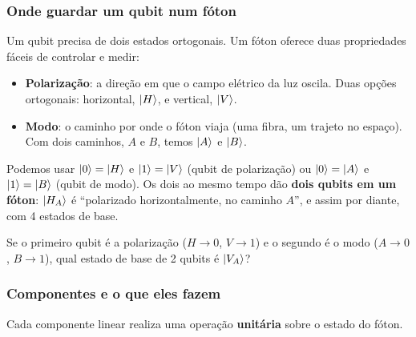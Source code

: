 \subsubsection{Onde guardar um qubit num fóton}\label{onde-guardar-um-qubit-num-fuxf3ton}

Um qubit precisa de dois estados ortogonais. Um fóton oferece duas propriedades fáceis de controlar e medir:

\begin{itemize}
\tightlist
\item
  \textbf{Polarização}: a direção em que o campo elétrico da luz oscila. Duas opções ortogonais: horizontal, \(\left|{H}\right>\), e vertical, \(\left|{V}\right>\).
\item
  \textbf{Modo}: o caminho por onde o fóton viaja (uma fibra, um trajeto no espaço). Com dois caminhos, \(A\) e \(B\), temos \(\left|{A}\right>\) e \(\left|{B}\right>\).
\end{itemize}

Podemos usar \(\left|{0}\right>=\left|{H}\right>\) e \(\left|{1}\right>=\left|{V}\right>\) (qubit de polarização) ou \(\left|{0}\right>=\left|{A}\right>\) e \(\left|{1}\right>=\left|{B}\right>\) (qubit de modo). Os dois ao mesmo tempo dão \textbf{dois qubits em um fóton}: \(\left|{H_A}\right>\) é ``polarizado horizontalmente, no caminho \(A\)'', e assim por diante, com 4 estados de base.

Se o primeiro qubit é a polarização (\(H\!\to\!0\), \(V\!\to\!1\)) e o segundo é o modo (\(A\!\to\!0\), \(B\!\to\!1\)), qual estado de base de 2 qubits é \(\left|{V_A}\right>\)?

\subsubsection{Componentes e o que eles fazem}\label{componentes-e-o-que-eles-fazem}

Cada componente linear realiza uma operação \textbf{unitária} sobre o estado do fóton.

